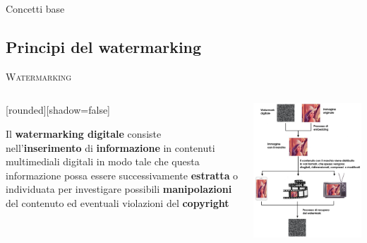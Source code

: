 \documentclass{beamer}
\begin{document}
\begin{section}{Concetti base}
\subsection {Principi del watermarking}
\begin{frame}[t]{\textsc{Watermarking}}
\begin{columns}
\begin{column}{5cm}
\vspace{1em}
	[rounded][shadow=false]
\begin{block}{}
\center \small{Il \textbf{watermarking digitale} consiste nell'\textbf{inserimento} di \textbf{informazione} in contenuti  multimediali digitali in modo tale che questa informazione possa essere successivamente \textbf{estratta} o individuata per investigare possibili \textbf{manipolazioni} del contenuto ed eventuali violazioni del \textbf{copyright}}
\end{block}
\end{column}
\begin{column}{5cm}
\centering
\includegraphics[width=1.1\linewidth]{./img/wat_workflow.jpg}
\end{column}
\end{columns}
\end{frame}


\end{section}
\end{document}
